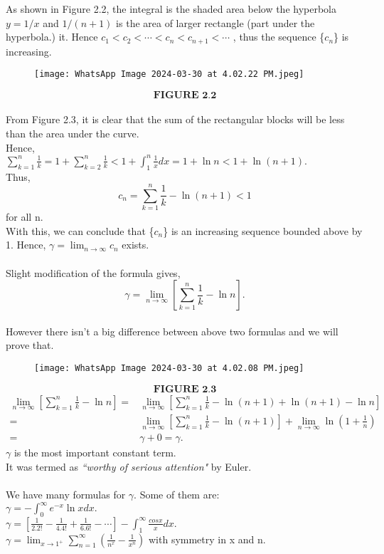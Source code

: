 \documentclass[a4paper,11pt]{article}
\begin{document}
As shown in Figure 2.2, the integral is the shaded area below the hyperbola $y = 1/x$   and $1/(n + 1)$ is the area of larger rectangle (part under the hyperbola.)
it. Hence $c_{1} < c_{2} < \cdots < c_{n} < c_{n+1}
 < \cdots$ , thus the sequence \{$c_{n}$\} is 
increasing.\\
\newpage
\begin{figure}
    \centering
    \texttt{[image: WhatsApp Image 2024-03-30 at 4.02.22 PM.jpeg]}
\end{figure}
$$\textbf{FIGURE 2.2}$$
\\
From Figure 2.3, it is clear that the sum of the rectangular blocks 
will be less than the  area under the curve.\\
Hence,\\
$\sum_{k=1}^{n}\frac{1}{k} = 1 + \sum_{k=2}^{n}\frac{1}{k}  < 1 + \int_{1}^{n}\frac{1}{x}dx = 1 + \ln n < 1 + \ln (n+1).$\\
Thus,\\
$$  c_{n} = \sum_{k=1}^{n} \frac{1}{k} - \ln(n+1) < 1$$ for all n.\\
With this, we can conclude that \{$c_{n}$\} is an increasing sequence bounded above by 1. Hence,
$\gamma = \lim_{n\to\infty}c_{n}$ exists.\\
\\
Slight modification of the formula gives,\\
$$ \gamma = \lim_{n\to\infty}[\sum_{k=1}^{n} \frac{1}{k} - \ln n ].$$\\
However there isn't a big difference between above two formulas and we will prove that.
\newpage
\begin{figure}
          \centering
        \texttt{[image: WhatsApp Image 2024-03-30 at 4.02.08 PM.jpeg]}
\end{figure}
$$\textbf{FIGURE 2.3}$$
\begin{align*}
\lim_{n\to\infty}[\sum_{k=1}^{n} \frac{1}{k} - \ln n ]
=& \lim_{n\to\infty}[\sum_{k=1}^{n} \frac{1}{k} -\ln(n+1) + \ln(n+1) - \ln n ]\\
=& \lim_{n\to\infty}[\sum_{k=1}^{n} \frac{1}{k} -\ln(n+1)] + \lim_{n\to\infty}\ln(1+\frac{1}{n})\\
=& \gamma + 0 = \gamma. 
\end{align*}
$\gamma$ is the most important constant term. 
\\It was termed as \textit{``worthy of serious attention"} by Euler.\\
\\
We have many formulas for $\gamma$. Some of them are:\\
$\gamma = -\int_{0}^{\infty}e^{-x}\ln x  dx .$\\
$\gamma = [\frac{1}{2.2!} - \frac{1}{4.4!} + \frac{1}{6.6!} - \cdots] - \int_{1}^{\infty} \frac{cosx}{x} dx.$\\
$\gamma = \lim_{x\to1^+} \sum_{n=1}^{\infty} ( \frac{1}{n^x} - \frac{1}{x^n} ) $ with symmetry in x and n.\\
\\
\end{document}
